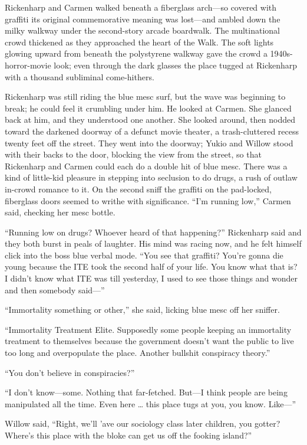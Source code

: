 Rickenharp and Carmen walked beneath a fiberglass arch—so covered with graffiti its original commemorative meaning was lost—and ambled down the milky walkway under the second-story arcade boardwalk. The multinational crowd thickened as they approached the heart of the Walk. The soft lights glowing upward from beneath the polystyrene walkway gave the crowd a 1940s-horror-movie look; even through the dark glasses the place tugged at Rickenharp with a thousand subliminal come-hithers.

Rickenharp was still riding the blue mesc surf, but the wave was beginning to break; he could feel it crumbling under him. He looked at Carmen. She glanced back at him, and they understood one another. She looked around, then nodded toward the darkened doorway of a defunct movie theater, a trash-cluttered recess twenty feet off the street. They went into the doorway; Yukio and Willow stood with their backs to the door, blocking the view from the street, so that Rickenharp and Carmen could each do a double hit of blue mesc. There was a kind of little-kid pleasure in stepping into seclusion to do drugs, a rush of outlaw in-crowd romance to it. On the second sniff the graffiti on the pad-locked, fiberglass doors seemed to writhe with significance. “I’m running low,” Carmen said, checking her mesc bottle.

“Running low on drugs? Whoever heard of that happening?” Rickenharp said and they both burst in peals of laughter. His mind was racing now, and he felt himself click into the boss blue verbal mode. “You see that graffiti? You’re gonna die young because the ITE took the second half of your life. You know what that is? I didn’t know what ITE was till yesterday, I used to see those things and wonder and then somebody said—”

“Immortality something or other,” she said, licking blue mesc off her sniffer.

“Immortality Treatment Elite. Supposedly some people keeping an immortality treatment to themselves because the government doesn’t want the public to live too long and overpopulate the place. Another bullshit conspiracy theory.”

“You don’t believe in conspiracies?”

“I don’t know—some. Nothing that far-fetched. But—I think people are being manipulated all the time. Even here … this place tugs at you, you know. Like—”

Willow said, “Right, we’ll ’ave our sociology class later children, you gotter? Where’s this place with the bloke can get us off the fooking island?”

